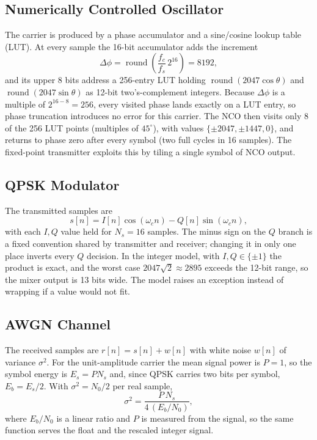 \documentclass[10pt,twocolumn,letterpaper]{article}
\begin{document}
\subsection{Numerically Controlled Oscillator}

The carrier is produced by a phase accumulator and a sine/cosine lookup table
(LUT). At every sample the 16-bit accumulator adds the increment
\begin{equation}
\Delta\phi = \operatorname{round}\!\left(\frac{f_c}{f_s}\,2^{16}\right)=8192,
\end{equation}
and its upper 8 bits address a 256-entry LUT holding
$\operatorname{round}(2047\cos\theta)$ and $\operatorname{round}(2047\sin\theta)$
as 12-bit two's-complement integers. Because $\Delta\phi$ is a multiple of
$2^{16-8}=256$, every visited phase lands exactly on a LUT entry, so phase
truncation introduces no error for this carrier. The NCO then visits only 8 of
the 256 LUT points (multiples of $45^\circ$), with values
$\{\pm2047,\pm1447,0\}$, and returns to phase zero after every symbol
(two full cycles in 16 samples). The fixed-point transmitter exploits this by
tiling a single symbol of NCO output.

\subsection{QPSK Modulator}

The transmitted samples are
\begin{equation}
s[n] = I[n]\cos(\omega_c n) - Q[n]\sin(\omega_c n),
\end{equation}
with each $I,Q$ value held for $N_s=16$ samples. The minus sign on the
$Q$ branch is a fixed convention shared by transmitter and receiver; changing
it in only one place inverts every $Q$ decision. In the integer model, with
$I,Q\in\{\pm1\}$ the product is exact, and the worst case
$2047\sqrt2\approx 2895$ exceeds the 12-bit range, so the mixer output is
13 bits wide. The model raises an exception instead of wrapping if a value
would not fit.

\subsection{AWGN Channel}

The received samples are $r[n]=s[n]+w[n]$ with white noise $w[n]$ of
variance $\sigma^2$. For the unit-amplitude carrier the mean signal power is
$P=1$, so the symbol energy is $E_s=PN_s$ and, since QPSK carries two bits
per symbol, $E_b=E_s/2$. With $\sigma^2=N_0/2$ per real sample,
\begin{equation}
\sigma^2=\frac{P\,N_s}{4\,(E_b/N_0)} ,
\end{equation}
where $E_b/N_0$ is a linear ratio and $P$ is measured from the signal, so the
same function serves the float and the rescaled integer signal.
\end{document}
